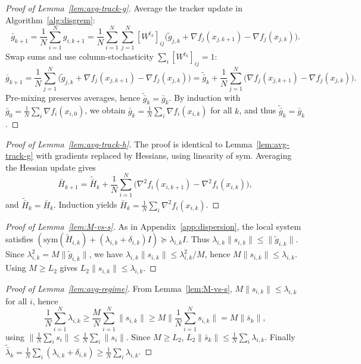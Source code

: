 \documentclass[11pt,a4paper]{article}
\begin{document}
\begin{proof}[Proof of Lemma~\ref{lem:avg-track-g}]
Average the tracker update in Algorithm~\ref{alg:disgrem}:
\[
\bar g_{k+1}
=\frac1N\sum_{i=1}^N g_{i,k+1}
=\frac1N\sum_{i=1}^N\sum_{j=1}^N [W^{t_k}]_{ij}\Big(\tilde g_{j,k}+\nabla f_j(x_{j,k+1})-\nabla f_j(x_{j,k})\Big).
\]
Swap sums and use column-stochasticity $\sum_i [W^{t_k}]_{ij}=1$:
\[
\bar g_{k+1}=\frac1N\sum_{j=1}^N\Big(\tilde g_{j,k}+\nabla f_j(x_{j,k+1})-\nabla f_j(x_{j,k})\Big)
=\tilde{\bar g}_k+\frac1N\sum_{j=1}^N\big(\nabla f_j(x_{j,k+1})-\nabla f_j(x_{j,k})\big).
\]
Pre-mixing preserves averages, hence $\tilde{\bar g}_k=\bar g_k$.
By induction with $\bar g_0=\frac1N\sum_i \nabla f_i(x_{i,0})$, we obtain
$\bar g_k=\frac1N\sum_i \nabla f_i(x_{i,k})$ for all $k$, and thus $\tilde{\bar g}_k=\bar g_k$.
\end{proof}

\begin{proof}[Proof of Lemma~\ref{lem:avg-track-h}]
The proof is identical to Lemma~\ref{lem:avg-track-g} with gradients replaced by Hessians, using linearity of $\mathrm{sym}$.
Averaging the Hessian update gives
\[
\bar H_{k+1}=\tilde{\bar H}_k+\frac1N\sum_{i=1}^N\big(\nabla^2 f_i(x_{i,k+1})-\nabla^2 f_i(x_{i,k})\big),
\]
and $\tilde{\bar H}_k=\bar H_k$. Induction yields $\bar H_k=\frac1N\sum_i \nabla^2 f_i(x_{i,k})$.
\end{proof}

\begin{proof}[Proof of Lemma~\ref{lem:M-vs-s}]
As in Appendix~\ref{app:dispersion}, the local system satisfies
$(\mathrm{sym}(\tilde H_{i,k})+(\lambda_{i,k}+\delta_{i,k})I)\succeq \lambda_{i,k}I$.
Thus $\lambda_{i,k}\|s_{i,k}\|\le \|\tilde g_{i,k}\|$.
Since $\lambda_{i,k}^2=M\|\tilde g_{i,k}\|$, we have $\lambda_{i,k}\|s_{i,k}\|\le \lambda_{i,k}^2/M$,
hence $M\|s_{i,k}\|\le \lambda_{i,k}$. Using $M\ge L_2$ gives $L_2\|s_{i,k}\|\le\lambda_{i,k}$.
\end{proof}

\begin{proof}[Proof of Lemma~\ref{lem:avg-regime}]
From Lemma~\ref{lem:M-vs-s}, $M\|s_{i,k}\|\le \lambda_{i,k}$ for all $i$, hence
\[
\frac1N\sum_{i=1}^N\lambda_{i,k}\ge \frac{M}{N}\sum_{i=1}^N\|s_{i,k}\|\ge M\Big\|\frac1N\sum_{i=1}^N s_{i,k}\Big\|=M\|\bar s_k\|,
\]
using $\|\frac1N\sum_i s_i\|\le \frac1N\sum_i\|s_i\|$.
Since $M\ge L_2$, $L_2\|\bar s_k\|\le \frac1N\sum_i\lambda_{i,k}$.
Finally $\tilde{\bar\lambda}_k=\frac1N\sum_i(\lambda_{i,k}+\delta_{i,k})\ge \frac1N\sum_i\lambda_{i,k}$.
\end{proof}
\end{document}
